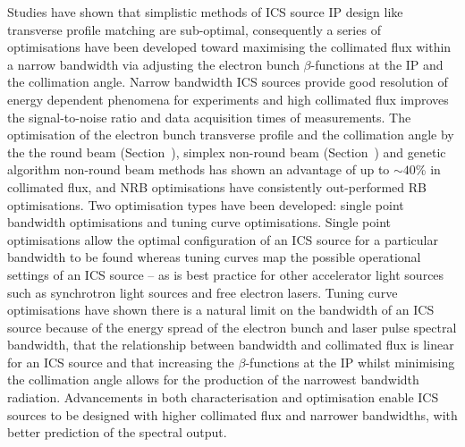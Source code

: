 \documentclass[../main.tex]{subfiles}
\begin{document}
Studies have shown that simplistic methods of ICS source IP design like transverse profile matching are sub-optimal, consequently a series of optimisations have been developed toward maximising the collimated flux within a narrow bandwidth via adjusting the electron bunch $\beta$-functions at the IP and the collimation angle. Narrow bandwidth ICS sources provide good resolution of energy dependent phenomena for experiments and high collimated flux improves the signal-to-noise ratio and data acquisition times of measurements. The optimisation of the electron bunch transverse profile and the collimation angle by the the round beam (Section~), simplex non-round beam (Section~) and genetic algorithm non-round beam methods has shown an advantage of up to $\sim 40$\% in collimated flux, and NRB optimisations have consistently out-performed RB optimisations. Two optimisation types have been developed: single point bandwidth optimisations and tuning curve optimisations. Single point optimisations allow the optimal configuration of an ICS source for a particular bandwidth to be found whereas tuning curves map the possible operational settings of an ICS source -- as is best practice for other accelerator light sources such as synchrotron light sources and free electron lasers. Tuning curve optimisations have shown there is a natural limit on the bandwidth of an ICS source because of the energy spread of the electron bunch and laser pulse spectral bandwidth, that the relationship between bandwidth and collimated flux is linear for an ICS source and that increasing the $\beta$-functions at the IP whilst minimising the collimation angle allows for the production of the narrowest bandwidth radiation. Advancements in both characterisation and optimisation enable ICS sources to be designed with higher collimated flux and narrower bandwidths, with better prediction of the spectral output. 
\end{document}
